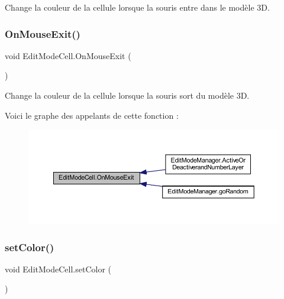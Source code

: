 Change la couleur de la cellule lorsque la souris entre dans le modèle 3D. 

\mbox{\label{class_edit_mode_cell_ad4e948c25ee58224ae23fa3288c4f2a1}} 
\subsubsection{\texorpdfstring{On\+Mouse\+Exit()}{OnMouseExit()}}
{\footnotesize\ttfamily void Edit\+Mode\+Cell.\+On\+Mouse\+Exit (\begin{DoxyParamCaption}{ }\end{DoxyParamCaption})\hspace{0.3cm}{\ttfamily [inline]}}



Change la couleur de la cellule lorsque la souris sort du modèle 3D. 

Voici le graphe des appelants de cette fonction \+:
\nopagebreak
\begin{figure}[H]
\begin{center}
\leavevmode
\includegraphics[width=350pt]{class_edit_mode_cell_ad4e948c25ee58224ae23fa3288c4f2a1_icgraph}
\end{center}
\end{figure}
\mbox{\label{class_edit_mode_cell_a38e231f9ad9dbee905d575660b77cfe2}} 
\subsubsection{\texorpdfstring{set\+Color()}{setColor()}}
{\footnotesize\ttfamily void Edit\+Mode\+Cell.\+set\+Color (\begin{DoxyParamCaption}{ }\end{DoxyParamCaption})\hspace{0.3cm}{\ttfamily [inline]}}

